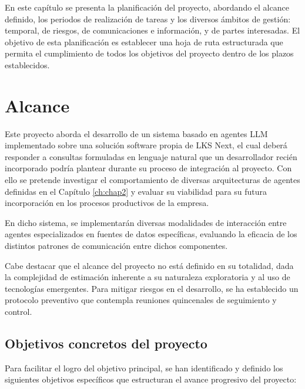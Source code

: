 

En este capítulo se presenta la planificación del proyecto, abordando el alcance definido, los periodos de realización de tareas y los diversos ámbitos de gestión: temporal, de riesgos, de comunicaciones e información, y de partes interesadas. El objetivo de esta planificación es establecer una hoja de ruta estructurada que permita el cumplimiento de todos los objetivos del proyecto dentro de los plazos establecidos.

\section{Alcance}

Este proyecto aborda el desarrollo de un sistema basado en agentes LLM implementado sobre una solución software propia de LKS Next, el cual deberá responder a consultas formuladas en lenguaje natural que un desarrollador recién incorporado podría plantear durante su proceso de integración al proyecto. Con ello se pretende investigar el comportamiento de diversas arquitecturas de agentes definidas en el Capítulo \ref{ch:chap2} y evaluar su viabilidad para su futura incorporación en los procesos productivos de la empresa.

En dicho sistema, se implementarán diversas modalidades de interacción entre agentes especializados en fuentes de datos específicas, evaluando la eficacia de los distintos patrones de comunicación entre dichos componentes.

Cabe destacar que el alcance del proyecto no está definido en su totalidad, dada la complejidad de estimación inherente a su naturaleza exploratoria y al uso de tecnologías emergentes. Para mitigar riesgos en el desarrollo, se ha establecido un protocolo preventivo que contempla reuniones quincenales de seguimiento y control.

\subsection{Objetivos concretos del proyecto}
\label{chap3:objetivos}

Para facilitar el logro del objetivo principal, se han identificado y definido los siguientes objetivos específicos que estructuran el avance progresivo del proyecto:

